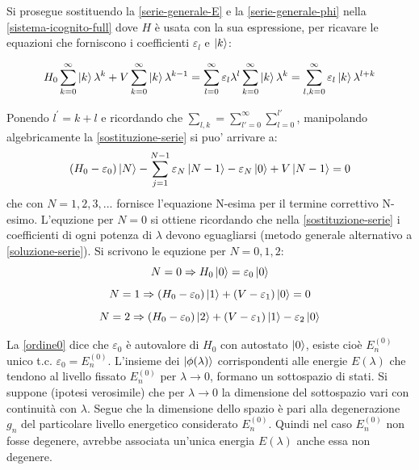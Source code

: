 \documentclass[a4paper, 10pt]{article}
\newcommand{\reff}[1]{\mbox{\ref{#1}}}
\begin{document}
Si prosegue sostituendo la \reff{serie-generale-E} e la \reff{serie-generale-phi} nella \reff{sistema-icognito-full} dove $H$ è usata con la sua espressione, per ricavare le equazioni che forniscono i coefficienti $\varepsilon_l$ e $\ket{k}$:
\begin{small}
	\begin{equation}
	\label{sostituzione-serie}
	H_0 \sum_{k = 0}^{\infty} \ket{k} \lambda^k + V \sum_{k = 0}^{\infty} \ket{k} \lambda^{k-1} = \sum_{l = 0}^{\infty} \varepsilon_l \lambda^l \sum_{k = 0}^{\infty} \ket{k} \lambda^k = \sum_{l,k = 0}^{\infty} \varepsilon_l \ket{k} \lambda^{l+k}
	\end{equation}
\end{small}
Ponendo $l^{'} = k+l$ e ricordando che $\sum_{l,k} = \sum_{l'=0}^{\infty} \sum_{l = 0}^{l'}$, manipolando algebricamente la \reff{sostituzione-serie} si puo' arrivare a:
\begin{equation}
	\label{soluzione-serie}
	(H_0 - \varepsilon_0) \ket{N} - \sum_{j = 1}^{N-1} \varepsilon_N \ket{N-1} - \varepsilon_N \ket{0} + V \ket{N-1} = 0
\end{equation}
che con $N = 1, 2, 3, ...$ fornisce l'equazione N-esima per il termine correttivo N-esimo. L'equzione per $N=0$ si ottiene ricordando che nella \reff{sostituzione-serie} i coefficienti di ogni potenza di $\lambda$ devono eguagliarsi (metodo generale alternativo a \reff{soluzione-serie}). Si scrivono le equzione per $N = 0, 1, 2$:
\begin{equation}
	\label{ordine0}
	N = 0 \Rightarrow  H_0 \ket{0} = \varepsilon_0 \ket{0}
\end{equation}
\begin{equation}
\label{ordine1}
N = 1 \Rightarrow  (H_0 - \varepsilon_0) \ket{1} + (V - \varepsilon_1) \ket{0} = 0
\end{equation}
\begin{equation}
\label{ordine2}
N = 2 \Rightarrow  (H_0 - \varepsilon_0) \ket{2} + (V - \varepsilon_1) \ket{1} -  \varepsilon_2 \ket{0}
\end{equation}

La \reff{ordine0} dice che $\varepsilon_0$ è autovalore di $H_0$ con autostato $\ket{0}$, esiste cioè $E_n^{(0)}$ unico t.c. $\varepsilon_0 = E_n^{(0)}$. L'insieme dei $\ket{\phi(\lambda)}$ corrispondenti alle energie $E(\lambda)$ che tendono al livello fissato $E_n^{(0)}$ per $\lambda \to 0$, formano un sottospazio di stati. Si suppone (ipotesi verosimile) che per $\lambda \to 0$ la dimensione del sottospazio vari con continuità con $\lambda$. Segue che la dimensione dello spazio è pari alla degenerazione $g_n$ del particolare livello energetico considerato $E_n^{(0)}$. Quindi nel caso $E_n^{(0)}$ non fosse degenere, avrebbe associata un'unica energia $E(\lambda)$ anche essa non degenere.
\end{document}
